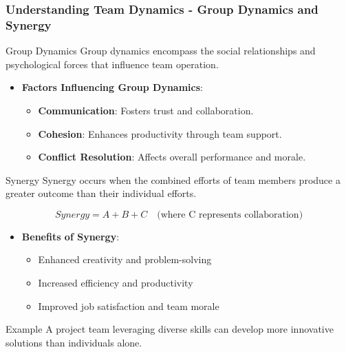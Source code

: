 \documentclass{beamer}
\begin{document}
\begin{frame}[fragile]
    \frametitle{Understanding Team Dynamics - Group Dynamics and Synergy}
    \begin{block}{Group Dynamics}
        Group dynamics encompass the social relationships and psychological forces that influence team operation.
    \end{block}
    \begin{itemize}
        \item \textbf{Factors Influencing Group Dynamics}:
        \begin{itemize}
            \item \textbf{Communication}: Fosters trust and collaboration.
            \item \textbf{Cohesion}: Enhances productivity through team support.
            \item \textbf{Conflict Resolution}: Affects overall performance and morale.
        \end{itemize}
    \end{itemize}
    \begin{block}{Synergy}
        Synergy occurs when the combined efforts of team members produce a greater outcome than their individual efforts.
    \end{block}
    \begin{equation}
        Synergy = A + B + C \quad \text{(where C represents collaboration)}
    \end{equation}
    \begin{itemize}
        \item \textbf{Benefits of Synergy}:
        \begin{itemize}
            \item Enhanced creativity and problem-solving
            \item Increased efficiency and productivity
            \item Improved job satisfaction and team morale
        \end{itemize}
    \end{itemize}
    \begin{block}{Example}
        A project team leveraging diverse skills can develop more innovative solutions than individuals alone.
    \end{block}
\end{frame}
\end{document}
